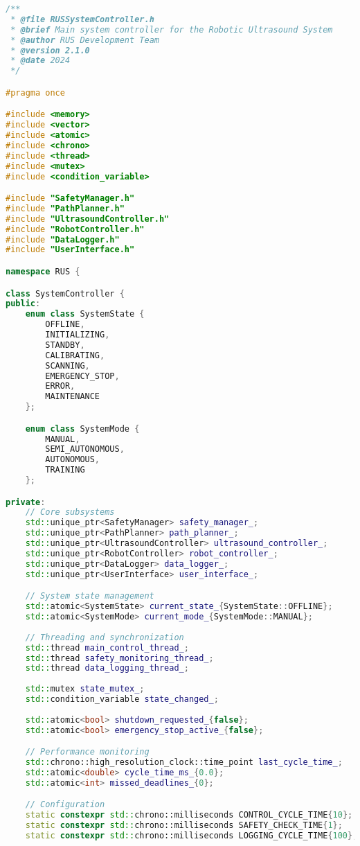 \begin{lstlisting}[language=C++, caption={Main System Controller Implementation}, label={lst:app-main-controller}]
/**
 * @file RUSSystemController.h
 * @brief Main system controller for the Robotic Ultrasound System
 * @author RUS Development Team
 * @version 2.1.0
 * @date 2024
 */

#pragma once

#include <memory>
#include <vector>
#include <atomic>
#include <chrono>
#include <thread>
#include <mutex>
#include <condition_variable>

#include "SafetyManager.h"
#include "PathPlanner.h"
#include "UltrasoundController.h"
#include "RobotController.h"
#include "DataLogger.h"
#include "UserInterface.h"

namespace RUS {

class SystemController {
public:
    enum class SystemState {
        OFFLINE,
        INITIALIZING,
        STANDBY,
        CALIBRATING,
        SCANNING,
        EMERGENCY_STOP,
        ERROR,
        MAINTENANCE
    };

    enum class SystemMode {
        MANUAL,
        SEMI_AUTONOMOUS,
        AUTONOMOUS,
        TRAINING
    };

private:
    // Core subsystems
    std::unique_ptr<SafetyManager> safety_manager_;
    std::unique_ptr<PathPlanner> path_planner_;
    std::unique_ptr<UltrasoundController> ultrasound_controller_;
    std::unique_ptr<RobotController> robot_controller_;
    std::unique_ptr<DataLogger> data_logger_;
    std::unique_ptr<UserInterface> user_interface_;

    // System state management
    std::atomic<SystemState> current_state_{SystemState::OFFLINE};
    std::atomic<SystemMode> current_mode_{SystemMode::MANUAL};
    
    // Threading and synchronization
    std::thread main_control_thread_;
    std::thread safety_monitoring_thread_;
    std::thread data_logging_thread_;
    
    std::mutex state_mutex_;
    std::condition_variable state_changed_;
    
    std::atomic<bool> shutdown_requested_{false};
    std::atomic<bool> emergency_stop_active_{false};

    // Performance monitoring
    std::chrono::high_resolution_clock::time_point last_cycle_time_;
    std::atomic<double> cycle_time_ms_{0.0};
    std::atomic<int> missed_deadlines_{0};

    // Configuration
    static constexpr std::chrono::milliseconds CONTROL_CYCLE_TIME{10}; // 100 Hz
    static constexpr std::chrono::milliseconds SAFETY_CHECK_TIME{1};   // 1 kHz
    static constexpr std::chrono::milliseconds LOGGING_CYCLE_TIME{100}; // 10 Hz


\end{lstlisting}
